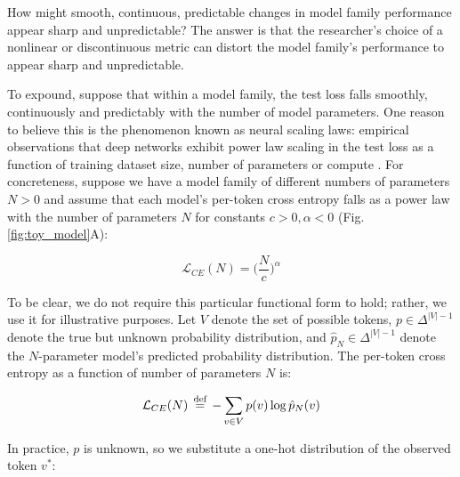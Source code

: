 How might smooth, continuous, predictable changes in model family performance appear sharp and unpredictable?
The answer is that the researcher's choice of a nonlinear or discontinuous metric can distort the model family's performance to appear sharp and unpredictable.

To expound, suppose that within a model family, the test loss falls smoothly, continuously and predictably with the number of model parameters.
One reason to believe this is the phenomenon known as neural scaling laws: empirical observations that deep networks exhibit power law scaling in the test loss as a function of training dataset size, number of parameters or compute \citep{hestness2017deep,rosenfeld2019constructive,henighan2020scaling,kaplan2020scaling,gordon2021data,hernandez2021scaling,jones2021scaling,zhai2022scaling,hoffmann2022training, clark2022unified, neumann2022scaling}.
For concreteness, suppose we have a model family of different numbers of parameters $N > 0$ and assume that each model's per-token cross entropy falls as a power law with the number of parameters $N$ for constants $c > 0, \alpha < 0$ (Fig. \ref{fig:toy_model}A):

\begin{equation*}
    \mathcal{L}_{CE}(N) = \Big(\frac{N}{c}\Big)^{\alpha}
\end{equation*}

To be clear, we do not require this particular functional form to hold; rather, we use it for illustrative purposes.
Let $V$ denote the set of possible tokens, $p \in \Delta^{|V|-1}$ denote the true but unknown probability distribution, and $\hat{p}_N \in \Delta^{|V|-1}$ denote the $N$-parameter model's predicted probability distribution.
The per-token cross entropy as a function of number of parameters $N$ is:

\begin{equation*}
    \mathcal{L}_{CE}(N) \; \operatorname{\stackrel{\text{def}}{=}} \; - \sum_{v \in V} p(v) \log \hat{p}_N(v)
\end{equation*}

In practice, $p$ is unknown, so we substitute a one-hot distribution of the observed token $v^*$:

